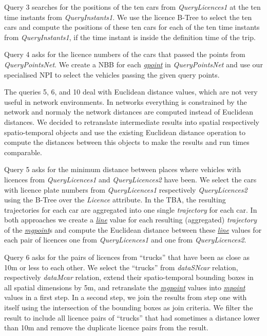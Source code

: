 \documentclass[a4paper]{article}
\newcommand{\dt}[1]{\textsl{\underline{#1}}}
\begin{document}
Query 3 searches for the positions of the ten cars from \textit{QueryLicences1} at the
ten time instants from \textit{QueryInstants1}. We use the licence B-Tree to select the
ten cars and compute the positions of these ten cars for each of the ten time
instants from \textit{QueryInstants1}, if the time instant is inside the definition
time
of the trip.

Query 4 asks for the licence numbers of the cars that passed the points
from \textit{QueryPointsNet}. We create a NBB for each \dt{gpoint} in
\textit{QueryPointsNet} and use our specialised NPI to select the vehicles passing the
given query points.

The queries 5, 6, and 10 deal with Euclidean distance values, which are not very
useful in network environments. In networks everything is constrained by the
network and normaly the network distances are computed instead of Euclidean
distances. We decided to retranslate intermediate results
into spatial respectively spatio-temporal objects and use the existing
Euclidean distance operation to compute the distances between this objects to
make the results and run times comparable.

Query 5 asks for the minimum distance between places where vehicles with
licences from \textit{QueryLicences1} and \textit{QueryLicences2} have been. We select the cars
with licence plate numbers from \textit{QueryLicences1} respectively \textit{QueryLicences2}
using the
B-Tree over the \textit{Licence} attribute. In the TBA, the
resulting trajectories for each car are aggregated into one single \textit{trajectory}
for each car. In both approaches we create a \dt{line} value for each resulting
(aggregated) \textit{trajectory} of the \dt{mgpoint}s and compute the Euclidean
distance
between these \dt{line} values for each pair of licences one from
\textit{QueryLicences1}
and one from \textit{QueryLicences2}.

Query 6 asks for the pairs of licences from ``trucks'' that have been as close
as
10m or less to each other. We select the ``trucks'' from \textit{dataSNcar} relation,
respectively \textit{dataMcar} relation, extend their spatio-temporal
bounding boxes in all spatial dimensions by 5m, and retranslate the
\dt{mgpoint} values into \dt{mpoint} values in a first step. In a second step,
we join the results from step one with itself using the intersection of the
bounding boxes as join criteria. We filter the result to include all licence
pairs of
``trucks'' that had sometimes a distance lower than 10m and remove the duplicate
licence pairs from the result.
\end{document}
